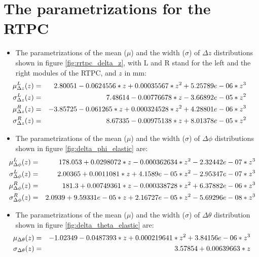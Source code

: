 \chapter{The parametrizations for the RTPC} \label{app:RTPC_appendix}
\begin{itemize}

\item The parametrizations of the mean ($\mu$) and the width ($\sigma$) of 
   $\Delta z$ distributions shown in figure \ref{fig:rrtpc_delta_z}, with L and 
   R stand for the left and the right modules of the RTPC, and $z$ in mm:
\small
\begin{eqnarray}
\hspace{-0.3in} \mu_{\Delta z}^{L}(z) &=& 2.80051 -0.0624556*z +0.00035567*z^{2} +5.25789e-06*z^{3}\\
\hspace{-0.3in} \sigma_{\Delta z}^{L}(z) &=& 7.48614 -0.00776678*z -3.66892e-05*z^{2}\\
\hspace{-0.3in} \mu_{\Delta z}^{R}(z) &=& -3.85725 -0.061265*z +0.000324528*z^{2} +4.28801e-06*z^{3}\\
\hspace{-0.3in} \sigma_{\Delta z}^{R}(z) &=& 8.67335 -0.00975138*z +8.01378e-05*z^{2}
\end{eqnarray}  
\normalsize
\item  The parametrizations of the mean ($\mu$) and the width ($\sigma$) of $\Delta \phi$ distributions shown in figure \ref{fig:delta_phi_elastic} are:
\small
\begin{eqnarray}
\hspace{-0.2in} \mu_{\Delta \phi}^{L}(z) &=& 178.053 +0.0298072*z -0.000362634*z^{2} -2.32442e-07*z^{3}\\
\hspace{-0.2in} \sigma_{\Delta \phi}^{L}(z) &=& 2.00365 +0.0011081*z +4.1589e-05*z^{2} -2.95347e-07*z^{3}\\
\hspace{-0.2in} \mu_{\Delta \phi}^{R}(z) &=& 181.3 +0.00749361*z -0.000338728*z^{2} +6.37882e-06*z^{3}\\
\hspace{-0.2in} \sigma_{\Delta \phi}^{R}(z) &=& 2.0939 +9.59331e-05*z +2.16727e-05*z^{2} -5.69296e-08*z^{3}
\end{eqnarray} 
\normalsize

\item The parametrizations of the mean ($\mu$) and the width ($\sigma$) of $\Delta \theta$ distribution shown in figure \ref{fig:delta_theta_elastic} are: 
\small
\begin{eqnarray}
\hspace{-0.2in} \mu_{\Delta \theta}(z) &=& -1.02349 -0.0487393*z +0.000219641*z^{2} +3.84156e-06*z^{3}\\
\hspace{-0.2in} \sigma_{\Delta \theta}(z) &=& 3.57854 +0.00639663*z
\end{eqnarray}
\normalsize


\end{itemize}
